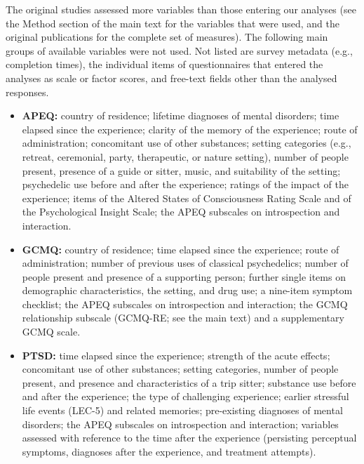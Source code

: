 \documentclass[man,floatsintext]{apa7}
\begin{document}
{\color{red}The original studies assessed more variables than those entering our analyses (see the Method section of the main text for the variables that were used, and the original publications for the complete set of measures). The following main groups of available variables were not used. Not listed are survey metadata (e.g., completion times), the individual items of questionnaires that entered the analyses as scale or factor scores, and free-text fields other than the analysed responses.

\begin{itemize}
	\item \textbf{APEQ:} country of residence; lifetime diagnoses of mental disorders; time elapsed since the experience; clarity of the memory of the experience; route of administration; concomitant use of other substances; setting categories (e.g., retreat, ceremonial, party, therapeutic, or nature setting), number of people present, presence of a guide or sitter, music, and suitability of the setting; psychedelic use before and after the experience; ratings of the impact of the experience; items of the Altered States of Consciousness Rating Scale and of the Psychological Insight Scale; the APEQ subscales on introspection and interaction.
	\item \textbf{GCMQ:} country of residence; time elapsed since the experience; route of administration; number of previous uses of classical psychedelics; number of people present and presence of a supporting person; further single items on demographic characteristics, the setting, and drug use; a nine-item symptom checklist; the APEQ subscales on introspection and interaction; the GCMQ relationship subscale (GCMQ-RE; see the main text) and a supplementary GCMQ scale.
	\item \textbf{PTSD:} time elapsed since the experience; strength of the acute effects; concomitant use of other substances; setting categories, number of people present, and presence and characteristics of a trip sitter; substance use before and after the experience; the type of challenging experience; earlier stressful life events (LEC-5) and related memories; pre-existing diagnoses of mental disorders; the APEQ subscales on introspection and interaction; variables assessed with reference to the time after the experience (persisting perceptual symptoms, diagnoses after the experience, and treatment attempts).
\end{itemize}}
\end{document}
